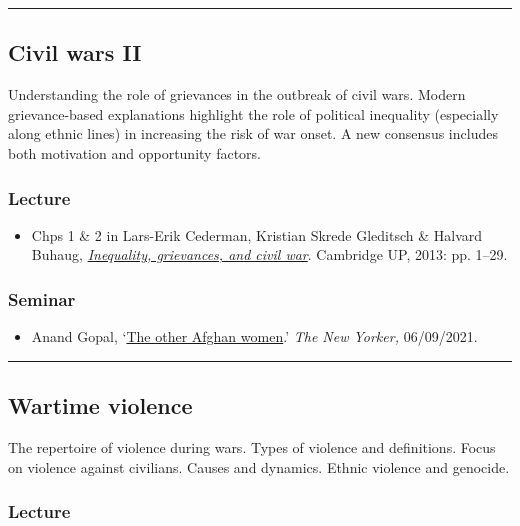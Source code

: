 \documentclass[12pt, a4paper]{article}
\begin{document}
\hrule %

\subsection{Civil wars II}\label{cw2}

Understanding the role of grievances in the outbreak of civil wars. Modern grievance-based explanations highlight the role of political inequality (especially along ethnic lines) in increasing the risk of war onset. A new consensus includes both motivation and opportunity factors.

\subsubsection*{Lecture}

\begin{itemize}
\setlength\itemsep{0pt}
\item Chps 1 \& 2 in Lars-Erik Cederman, Kristian Skrede Gleditsch \& Halvard Buhaug, \href{https://doi.org/10.1017/CBO9781139084161}{\textit{Inequality, grievances, and civil war}}. Cambridge UP, 2013: pp. 1--29.
\end{itemize}

\subsubsection*{Seminar}

\begin{itemize}
\setlength\itemsep{0pt}
\item Anand Gopal, `\href{https://www.newyorker.com/magazine/2021/09/13/the-other-afghan-women}{The other Afghan women}.' \textit{The New Yorker,} 06/09/2021.
\end{itemize}

\hrule %

\subsection{Wartime violence}\label{wartime_violence}

The repertoire of violence during wars. Types of violence and definitions. Focus on violence against civilians. Causes and dynamics. Ethnic violence and genocide.

\subsubsection*{Lecture}
\end{document}
